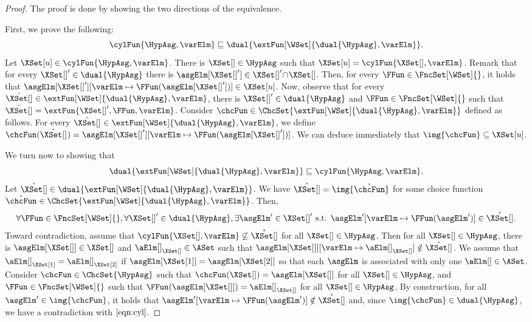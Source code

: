 \documentclass[authoryear]{elsarticle}
\newcommand{\Team}[1][]{{\XSet[#1]}}
\newcommand{\TeamInDual}[1][]{\Team[#1]'}
\newcommand{\TeamInDDual}{\mathring{\Team}}
\newcommand{\TeamHat}[1][]{\hat{\Team}_{#1}}
\newcommand{\domainValue}[1][]{{\aElm[#1]}}
\begin{document}
\lmmcylext*
%
\begin{proof}
	The proof is done by showing the two directions of the equivalence.

	First, we prove the following:
%
        $$\cylFun{\HypAsg,\varElm}\sqsubseteq \dual{\extFun[\WSet]{\dual{\HypAsg}, \varElm}}.$$
%
	Let $\Team[u] \in \cylFun{\HypAsg, \varElm}$. There is $\Team\in\HypAsg$
	such that $\Team[u] = \cylFun{\Team, \varElm}$. Remark that for every
	$\TeamInDual\in{\dual{\HypAsg}}$ there is
	${\asgElm[\TeamInDual]}\in\TeamInDual\!\cap\!\Team$. Then, for every
	$\FFun \in \FncSet[\WSet]{}$, it holds that
	${\asgElm[\TeamInDual]}[\varElm \mapsto
	\FFun({\asgElm[\TeamInDual]})]\in\Team[u]$.
%
        Now, observe that for every $\TeamHat \in \extFun[\WSet]{\dual{
            \HypAsg}, \varElm}$, there is $\TeamInDual \in \dual{\HypAsg}$ and
        $\FFun \in \FncSet[\WSet]{}$ such that $\TeamHat =
        \extFun{\TeamInDual,\FFun,\varElm}$.
        Consider $\chcFun \in \ChcSet{ {\extFun[\WSet]{ \dual{\HypAsg},
              \varElm}}}$ defined as follows.
        For every $\TeamHat \in \extFun[\WSet]{\dual{\HypAsg}, \varElm}$, we
	define $\chcFun(\TeamHat) =
	\asgElm[{\TeamInDual}]{}[\varElm\mapsto\FFun(\asgElm[\TeamInDual])]$.
        We can deduce immediately that $\img{\chcFun}\subseteq\Team[u]$.

	We turn now to showing that
%
	$$\dual{\extFun[\WSet]{\dual{\HypAsg}, \varElm}}\sqsubseteq\cylFun{\HypAsg,\varElm}.$$
%
	Let $\TeamInDDual \in \dual{\extFun[\WSet]{\dual{\HypAsg}, \varElm}}$.
        We have $\TeamInDDual = \img{\mathring{\chcFun}}$ for some choice
        function $\mathring{\chcFun} \in \ChcSet{ {\extFun[\WSet]{ \dual{
                \HypAsg}, \varElm}}}$.
%
        Then,
        \begin{equation}\label{eqn:cyl}
          \forall \FFun \in \FncSet[\WSet]{}, \forall
          \TeamInDual\in{\dual{\HypAsg}}, \exists \asgElm'\in\TeamInDual \text{
            s.t. } \asgElm'[\varElm\mapsto\FFun(\asgElm')]\in\TeamInDDual.
	\end{equation} Toward contradiction, assume that $\cylFun{\Team,
          \varElm} \not\subseteq \TeamInDDual$ for all $\Team \in \HypAsg$. Then
	for all $\Team \in \HypAsg$, there is $\asgElm[\Team]\in\Team$ and
	$\domainValue_{\Team} \in \ASet$ such that
	$\asgElm[\Team]{}[\varElm\mapsto\domainValue_{\Team}]\notin
	\TeamInDDual$. We assume that
	$\domainValue_{\Team[1]}=\domainValue_{\Team[2]}$ if
	$\asgElm[{\Team[1]}]=\asgElm[{\Team[2]}]$ so that each $\asgElm$ is
	associated with only one $\domainValue \in \ASet$. Consider $\chcFun \in
	\ChcSet{\HypAsg}$ such that $\chcFun(\Team) = \asgElm[\Team]$ for all
	$\Team \in \HypAsg$, and $\FFun \in \FncSet[\WSet]{}$ such that
	$\FFun(\asgElm[\Team]) = \domainValue_{\Team}$ for all $\Team \in
	\HypAsg$.
        By construction, for all $\asgElm' \in \img{\chcFun}$, it holds that
	$\asgElm'[\varElm\mapsto\FFun(\asgElm')]\notin\TeamInDDual$ and, since
	$\img{\chcFun} \in \dual{\HypAsg}$, we have a contradiction with
	$\eqref{eqn:cyl}$.
\end{proof}
\end{document}
